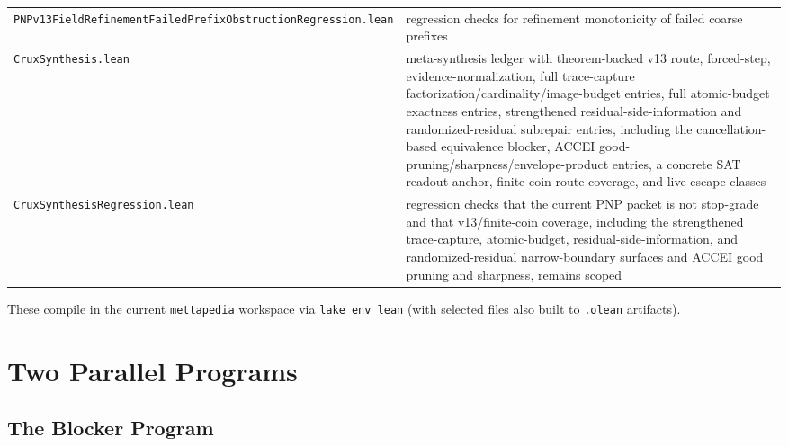 \documentclass[11pt]{article}
\theoremstyle{remark}
\begin{document}
\begin{center}
\begin{tabular}{ll}
\texttt{PNPv13FieldRefinementFailedPrefixObstructionRegression.lean} & regression checks for refinement monotonicity of failed coarse prefixes \\
\texttt{CruxSynthesis.lean} & meta-synthesis ledger with theorem-backed v13 route, forced-step, evidence-normalization, full trace-capture factorization/cardinality/image-budget entries, full atomic-budget exactness entries, strengthened residual-side-information and randomized-residual subrepair entries, including the cancellation-based equivalence blocker, ACCEI good-pruning/sharpness/envelope-product entries, a concrete SAT readout anchor, finite-coin route coverage, and live escape classes \\
\texttt{CruxSynthesisRegression.lean} & regression checks that the current PNP packet is not stop-grade and that v13/finite-coin coverage, including the strengthened trace-capture, atomic-budget, residual-side-information, and randomized-residual narrow-boundary surfaces and ACCEI good pruning and sharpness, remains scoped \\
\bottomrule
\end{tabular}
\end{center}

These compile in the current \texttt{mettapedia} workspace via \texttt{lake env lean}
(with selected files also built to \texttt{.olean} artifacts).

\section{Two Parallel Programs}

\subsection{The Blocker Program}
\end{document}
